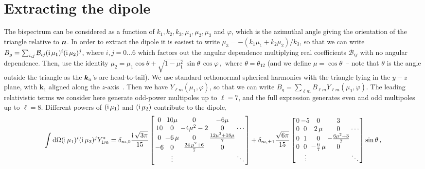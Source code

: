 \section{Extracting the dipole}

The bispectrum can be considered as a function of
$k_1,k_2,k_3,\mu_1, \mu_2,\mu_3$ and $\varphi$, which is the azimuthal angle giving the orientation of the triangle  relative to $\bm {n}$. In order to extract the dipole it is easiest to write $\mu_3=-(k_1\mu_1+k_2\mu_2)/k_3$, so that we can write $B_g = \sum_{i,j} \mathcal{B}_{ij}(\mathrm{i\,}\mu_1)^i(\mathrm{i\,}\mu_2)^j$, where $i,j=0\ldots6$ which factors out the angular dependence multiplying real coefficients $\mathcal{B}_{ij}$ with no angular dependence. Then,
 use the identity 
$%
\mu_2=\mu_1\cos\theta+\sqrt{1-\mu_1^2}\,\sin\theta\,\cos\varphi\,,
$ %
where $\theta=\theta_{12}$ (and we define $\mu=\cos\theta$~-- note that $\theta$ is the angle outside the triangle as the $\bm {k}_a$'s are head-to-tail). We use standard orthonormal spherical harmonics with the triangle lying in the $y-z$ plane, with $\bm k_1$ aligned along the $z$-axis~\citep{Nan:2017oaq}. Then we have $Y_{\ell m}(\mu_1,\varphi)$, so that we can write $B_g =\sum_{\ell m} B_{\ell m}Y_{\ell m}(\mu_1,\varphi)$. The leading relativistic terms we consider here generate odd-power multipoles up to $\ell=7$, and the full expression generates even and odd multipoles up to $\ell=8$.
Different powers of $(\mathrm{i\,}\mu_1)$ and $(\mathrm{i\,}\mu_2)$ contribute to the dipole, 
\begin{equation}
\arraycolsep=1.0pt\def\arraystretch{1}
\int\mathrm{d}\Omega (\i\mu_1)^i  (\i \mu_2)^j Y^*_{1 m} = 
 \delta_{m,0}\frac{\i\sqrt{3\pi}}{15}\left[ \begin {array}{ccccc} 
 0&10\mu&0&-6\mu  &\\ 
10&0&-4{\mu}^{2}-2&0& \cdots\\ 
0&-6\,\mu&0&{\frac {12{
\mu}^{3}+18\mu}{7}}& \\ 
-6&0&{\frac {24
\,{\mu}^{2}+6}{7}}&0& \\
 &\vdots & & & \ddots
\end {array} \right] 
+
\delta_{m,\pm1}\frac{\sqrt{6\pi}}{15}
 \left[ \begin {array}{ccccc} 0&-5&0&3&\\ 
 0&0&2\,\mu&0
& \cdots\\ 
0&1&0&-\frac{6{\mu}^{2}+3}{7}&\\ 
0&0
&-\frac{6}{7}\,\mu&0&\\
 &\vdots & & & \ddots
\end {array} \right] \sin\theta\,,
\label{dkjsncdjcnsk}
\end{equation}
